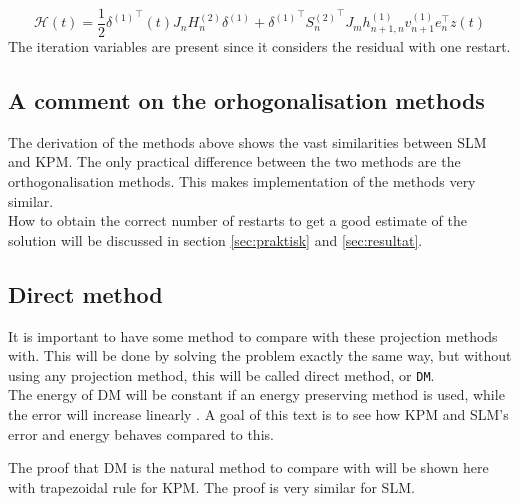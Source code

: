 \begin{equation}
\mathcal{H} (t) = \frac{1}{2} {\delta^{(1)}}^\top (t) J_n H_n^{(2)} \delta^{(1)} + {\delta^{(1)}}^\top {S_n^{(2)}}^\top  J_m h_{n+1,n}^{(1)} v_{n+1}^{(1)} e_n^\top z(t)
\label{eqn:energy4}
\end{equation}
The iteration variables are present since it considers the residual with one restart.

\subsection{A comment on the orhogonalisation methods} %
The  derivation of the methods above shows the vast similarities between SLM and KPM. The only practical difference between the two methods are the orthogonalisation methods. This makes implementation of the methods very similar.  \\

How to obtain the correct number of restarts to get a good estimate of the solution will be discussed in section \ref{sec:praktisk} and \ref{sec:resultat}.

\subsection{Direct method} \label{sec:DM}
It is important to have some method to compare with these projection methods with. This will be done by solving the problem exactly the same way, but without using any projection method, this will be called direct method, or \texttt{DM}. \\

The energy of DM will be constant if an energy preserving method is used, while the error will increase linearly \cite{!!!!!!!!}. A goal of this text is to see how KPM and SLM's error and energy behaves compared to this. 

The proof that DM is the natural method to compare with will be shown here with trapezoidal rule for KPM. The proof is very similar for SLM. \\

